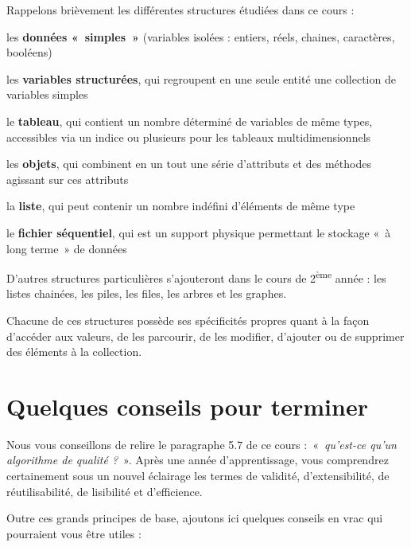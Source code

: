 Rappelons brièvement les différentes structures étudiées dans ce cours
 :

\begin{liste}
	\item 
		les \textbf{données «~simples~»} (variables isolées : entiers, réels,
		chaines, caractères, booléens)
	\item 
		les \textbf{variables structurées}, qui regroupent en une seule entité
		une collection de variables simples
	\item 
		le \textbf{tableau}, qui contient un nombre déterminé de variables de
		même types, accessibles via un indice ou plusieurs pour les tableaux
		multidimensionnels
	\item 
		les \textbf{objets}, qui combinent en un tout une série d’attributs et
		des méthodes agissant sur ces attributs
	\item 
		la \textbf{liste}, qui peut contenir un nombre indéfini d’éléments de
		même type
	\item 
		le \textbf{fichier séquentiel}, qui est un support physique permettant
		le stockage «~à long terme~» de données
\end{liste}

D’autres structures particulières s’ajouteront dans le cours de
2\textsuperscript{ème} année : les listes chainées, les piles, les
files, les arbres et les graphes.

Chacune de ces structures possède ses spécificités propres quant à la
façon d’accéder aux valeurs, de les parcourir, de les modifier,
d’ajouter ou de supprimer des éléments à la collection. 


\section{Quelques conseils pour terminer}

Nous vous conseillons de relire le paragraphe 5.7 de ce cours
:~«~\textit{qu’est-ce qu’un algorithme de qualité ?}~». Après une année
d’apprentissage, vous comprendrez certainement sous un nouvel éclairage
les termes de validité, d’extensibilité, de réutilisabilité, de
lisibilité et d’efficience.

Outre ces grands principes de base, ajoutons ici quelques conseils en
vrac qui pourraient vous être utiles :

